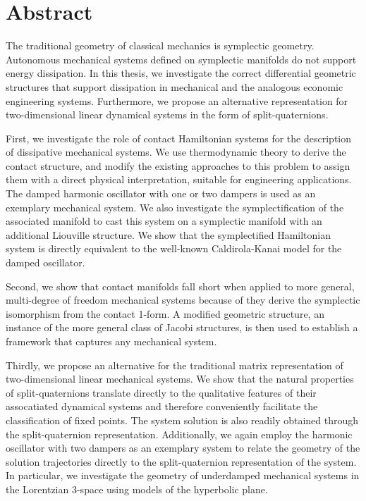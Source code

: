\chapter*{Abstract}%

The traditional geometry of classical mechanics is symplectic geometry. Autonomous mechanical systems defined on symplectic manifolds do not support energy dissipation. In this thesis, we investigate the correct differential geometric structures that support dissipation in mechanical and the analogous economic engineering systems. Furthermore, we propose an alternative representation for two-dimensional linear dynamical systems in the form of split-quaternions.

First, we investigate the role of contact Hamiltonian systems for the description of dissipative mechanical systems. We use thermodynamic theory to derive the contact structure, and modify the existing approaches to this problem to assign them with a direct physical interpretation, suitable for engineering applications. The damped harmonic oscillator with one or two dampers is used as an exemplary mechanical system. We also investigate the symplectification of the associated manifold to cast this system on a symplectic manifold with an additional Liouville structure. We show that the symplectified Hamiltonian system is directly equivalent to the well-known Caldirola-Kanai model for the damped oscillator.

Second, we show that contact manifolds fall short when applied to more general, multi-degree of freedom mechanical systems because of they derive the symplectic isomorphism from the contact 1-form. A modified geometric structure, an instance of the more general class of Jacobi structures, is then used to establish a framework that captures any mechanical system.  

Thirdly, we propose an alternative for the traditional matrix representation of two-dimensional linear mechanical systems. We show that the natural properties of split-quaternions translate directly to the qualitative features of their assocatiated dynamical systems and therefore conveniently facilitate the classification of fixed points. The system solution is also readily obtained through the split-quaternion representation. Additionally, we again employ the harmonic oscillator with two dampers as an exemplary system to relate the geometry of the solution trajectories directly to the split-quaternion representation of the system. In particular, we investigate the geometry of underdamped mechanical systems in the Lorentzian 3-space using models of the hyperbolic plane.

 

